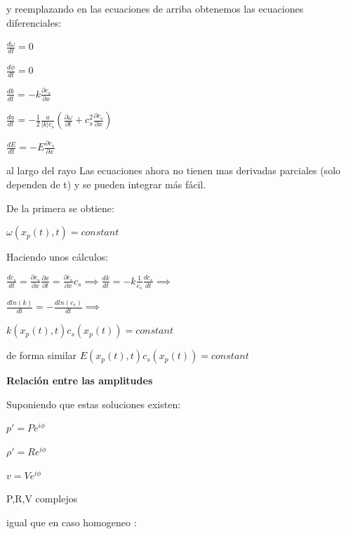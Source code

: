 \documentclass{article}
\begin{document}
y reemplazando en las ecuaciones de arriba obtenemos  las ecuaciones diferenciales:
\begin{description}  
\item $\frac{d\omega}{dt} = 0$
\item $\frac{d\phi}{dt} = 0$
\item $\frac{dk}{dt} = -k \frac{\partial c_s}{\partial x} $
\item $\frac{da}{dt} = -\frac{1}{2} \frac{a}{|k| c_s} (\frac{\partial \omega}{\partial t} + c_s^{2}  \frac{\partial c_s}{\partial x}) $
\item$\frac{dE}{dt} = -E \frac{\partial  c_s}{\partial x} $

\end{description}
al largo del rayo
Las ecuaciones ahora no tienen mas derivadas parciales (solo dependen de t) y se pueden integrar más fácil.
\begin{description}
\item De la primera se obtiene:  
\item $ \omega(x_p(t), t)  = constant $
\end{description}
Haciendo unos cálculos:
\begin{description}  
\item $\frac{dc_s}{dt} =  \frac{\partial c_s}{\partial x} \frac{\partial x}{\partial t} = \frac{\partial c_s}{\partial x}  c_s\implies
\frac{dk}{dt} = -k  \frac{1}{c_s} \frac{dc_s}{dt} \implies$
\item $\frac{dln(k)}{dt} = - \frac{dln(c_s)}{dt} \implies $
\item $ k(x_p(t), t)  c_s(x_p(t)) = constant $
\item de forma similar $ E(x_p(t), t)  c_s(x_p(t)) = constant $ 
\end{description}

\textbf{Relación entre las amplitudes}

\begin{description}  
\item Suponiendo que estas soluciones existen:
\item $p\prime = P e^{i\phi}$
\item $\rho\prime = R e^{i\phi}$
\item $v = V e^{i\phi}$
\item P,R,V  complejos
\end{description}

igual que en caso homogeneo :
\end{document}
